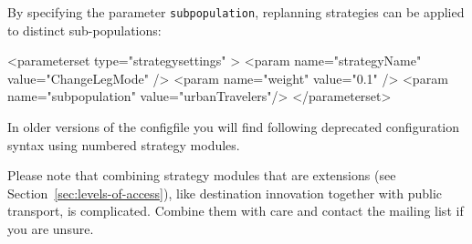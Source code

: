 By specifying the parameter \lstinline|subpopulation|, replanning strategies can be applied to distinct sub-populations: \eg
\begin{xml}
	<parameterset type="strategysettings" >
		<param name="strategyName" value="ChangeLegMode" />
		<param name="weight" value="0.1" />
		<param name="subpopulation" value="urbanTravelers"/>
	</parameterset>
\end{xml}

In older versions of the \gls{configfile} you will find following deprecated configuration syntax using numbered strategy modules.
%
%
%
%
%


Please note that combining strategy modules that are \glspl{extension} (see Section~\ref{sec:levels-of-access}), like destination innovation together with public transport, is complicated. Combine them with care and contact the mailing list if you are unsure.


